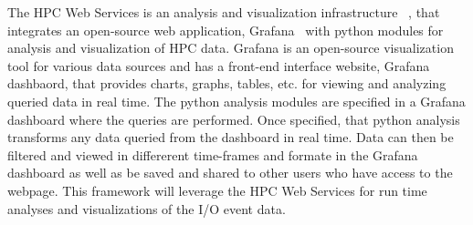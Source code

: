 The HPC Web Services is an analysis and visualization infrastructure ~\cite{ClusterAV}, that integrates an open-source web application, Grafana~\cite{grafana-website} with python modules for analysis and visualization of HPC data. Grafana is an open-source visualization tool for various data sources and has a front-end interface website, Grafana dashbaord, that provides charts, graphs, tables, etc. for viewing and analyzing queried data in real time. The python analysis modules are specified in a Grafana dashboard where the queries are performed. Once specified, that python analysis transforms any data queried from the dashboard in real time. Data can then be filtered and viewed in differerent time-frames and formate in the Grafana dashboard as well as be saved and shared to other users who have access to the webpage. This framework will leverage the HPC Web Services for run time analyses and visualizations of the I/O event data.